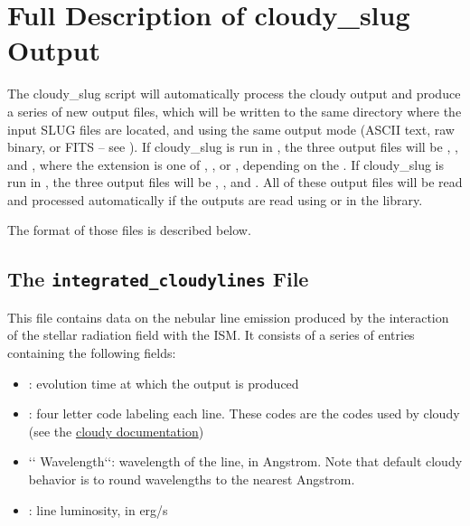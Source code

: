 \documentclass[letterpaper,10pt,english]{sphinxmanual}
\begin{document}
\section{Full Description of cloudy\_slug Output}
\label{cloudy:ssec-cloudy-output}\label{cloudy:full-description-of-cloudy-slug-output}
The cloudy\_slug script will automatically process the cloudy output
and produce a series of new output files, which will be written to the
same directory where the input SLUG files are located, and using the
same output mode (ASCII text, raw binary, or FITS -- see
{\hyperref[output:sec-output]{\emph{}}}). If cloudy\_slug is run in
{\hyperref[cloudy:sssec-cloudy-integrated-mode]{\emph{}}}, the three output files will be
,
, and
, where the extension 
is one of , , or , depending on the
. If cloudy\_slug is run in
{\hyperref[cloudy:sssec-cloudy-cluster-mode]{\emph{}}}, the three output files will be
,
, and
. All of these output files will
be read and processed automatically if the outputs are read using
 or  in the {\hyperref[slugpy:sec-slugpy]{\emph{}}}
library.

The format of those files is described below.


\subsection{The \texttt{integrated\_cloudylines} File}
\label{cloudy:the-integrated-cloudylines-file}
This file contains data on the nebular line emission produced by the
interaction of the stellar radiation field with the ISM. It consists
of a series of entries containing the following fields:
\begin{itemize}
\item {} 
: evolution time at which the output is produced

\item {} 
: four letter code labeling each line. These codes
are the codes used by cloudy (see the \href{http://nublado.org}{cloudy documentation})

\item {} 
{}`{}` Wavelength{}`{}`: wavelength of the line, in Angstrom. Note that
default cloudy behavior is to round wavelengths to the nearest
Angstrom.

\item {} 
: line luminosity, in erg/s

\end{itemize}
\end{document}
